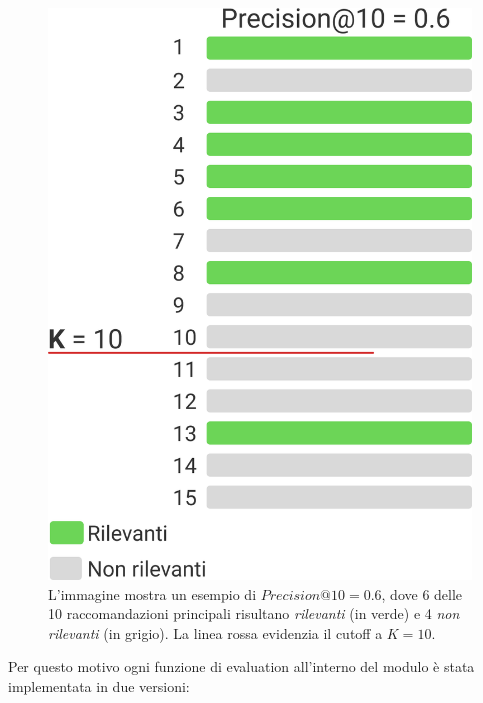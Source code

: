 \begin{figure}[H]
    \centering
    \includegraphics[scale=0.7]{figures/algorithms/precision_@_k.png}
    \caption{L'immagine mostra un esempio di $Precision@10 = 0{.}6$, dove 6 delle 10 raccomandazioni principali risultano \textit{rilevanti} (in verde) e 4 \textit{non rilevanti} (in grigio). La linea rossa evidenzia il cutoff a $K = 10$.}
\end{figure}

Per questo motivo ogni funzione di evaluation all'interno del modulo è stata implementata in due versioni:

